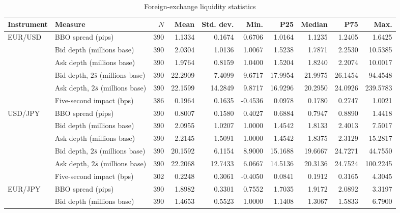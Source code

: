 \documentclass[11pt]{article}
\begin{document}
\begin{landscape}
\begin{table}[H]
\centering
\caption{Foreign-exchange liquidity statistics}
\label{tab:fx-liquidity}
\scriptsize
\begin{threeparttable}
\begin{tabular}{@{}llrrrrrrrr@{}}
\toprule
Instrument & Measure & $N$ & Mean & Std. dev. & Min. & P25 & Median & P75 & Max.\\
\midrule
EUR/USD & BBO spread (pips) & 390 & 1.1334 & 0.1674 & 0.6706 & 1.0164 & 1.1235 & 1.2405 & 1.6425\\
        & Bid depth (millions base) & 390 & 2.0304 & 1.0136 & 1.0067 & 1.5238 & 1.7871 & 2.2530 & 10.5385\\
        & Ask depth (millions base) & 390 & 1.9764 & 0.8159 & 1.0400 & 1.5204 & 1.8240 & 2.2074 & 10.0017\\
        & Bid depth, $2\bar{s}$ (millions base) & 390 & 22.2909 & 7.4099 & 9.6717 & 17.9954 & 21.9975 & 26.1454 & 94.4548\\
        & Ask depth, $2\bar{s}$ (millions base) & 390 & 22.1599 & 14.2849 & 9.8717 & 16.9296 & 20.2950 & 24.0926 & 239.5783\\
        & Five-second impact (bps) & 386 & 0.1964 & 0.1635 & -0.4536 & 0.0978 & 0.1780 & 0.2747 & 1.0021\\
\addlinespace
USD/JPY & BBO spread (pips) & 390 & 0.8007 & 0.1580 & 0.4027 & 0.6884 & 0.7947 & 0.8890 & 1.4418\\
        & Bid depth (millions base) & 390 & 2.0955 & 1.0207 & 1.0000 & 1.4542 & 1.8133 & 2.4013 & 7.5017\\
        & Ask depth (millions base) & 390 & 2.2145 & 1.5091 & 1.0000 & 1.4542 & 1.8375 & 2.3129 & 15.2817\\
        & Bid depth, $2\bar{s}$ (millions base) & 390 & 20.1592 & 6.1154 & 8.9000 & 15.1688 & 19.6667 & 24.7271 & 44.7550\\
        & Ask depth, $2\bar{s}$ (millions base) & 390 & 22.2068 & 12.7433 & 6.0667 & 14.5136 & 20.3136 & 24.7524 & 100.2245\\
        & Five-second impact (bps) & 302 & 0.2248 & 0.3061 & -0.4050 & 0.0841 & 0.1912 & 0.3165 & 4.3045\\
\addlinespace
EUR/JPY & BBO spread (pips) & 390 & 1.8982 & 0.3301 & 0.7552 & 1.7035 & 1.9172 & 2.0892 & 3.3197\\
        & Bid depth (millions base) & 390 & 1.4653 & 0.5523 & 1.0000 & 1.1408 & 1.3067 & 1.5833 & 6.7900\\

\end{tabular}
\end{threeparttable}
\end{table}
\end{landscape}
\end{document}
